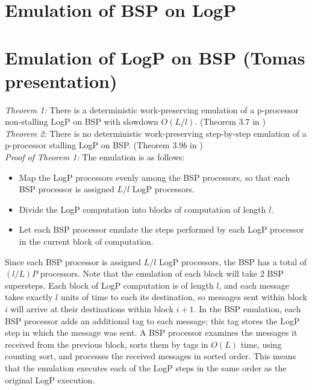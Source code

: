 \documentclass[12pt,a4paper]{article}
\begin{document}
\newpage
\section{Emulation of BSP on LogP}


\newpage
\section{Emulation of LogP on BSP (Tomas presentation)}

\emph{Theorem 1:}
There is a deterministic work-preserving emulation of a p-processor non-stalling LogP on BSP with slowdown $O(L/l)$.
(Theorem $3.7$ in \cite{Vlr03})\\

\noindent \emph{Theorem 2: }
There is no deterministic work-preserving step-by-step emulation of a p-processor stalling LogP on BSP.
(Theorem $3.9b$ in \cite{Vlr03})\\

\noindent\emph{Proof of Theorem 1:} 
The emulation is as follows:
\begin{itemize}
\item Map the LogP processors evenly among the BSP processors, so that each BSP processor is assigned $L/l$ LogP processors.
\item Divide the LogP computation into blocks of computation of length $l$.
\item Let each BSP processor emulate the steps performed by each LogP processor in the current block of computation.
\end{itemize}

Since each BSP processor is assigned $L/l$ LogP processors, the BSP has a total of $(l/L)P$ processors.
Note that the emulation of each block will take 2 BSP supersteps. Each block of LogP computation
is of length $l$, and each message takes exactly $l$ units of time to each its destination, so messages sent within block $i$ will arrive at
their destinations within block $i+1$. In the BSP emulation, each BSP processor adds an additional tag to each message; this tag stores the LogP
step in which the message was sent. A BSP processor examines the messages it received from the previous block, sorts them by tags in $O(L)$ time,
using counting sort, and processes the received messages in sorted order. This means that the emulation executes each of the LogP steps in the same
order as the original LogP execution.
\end{document}
